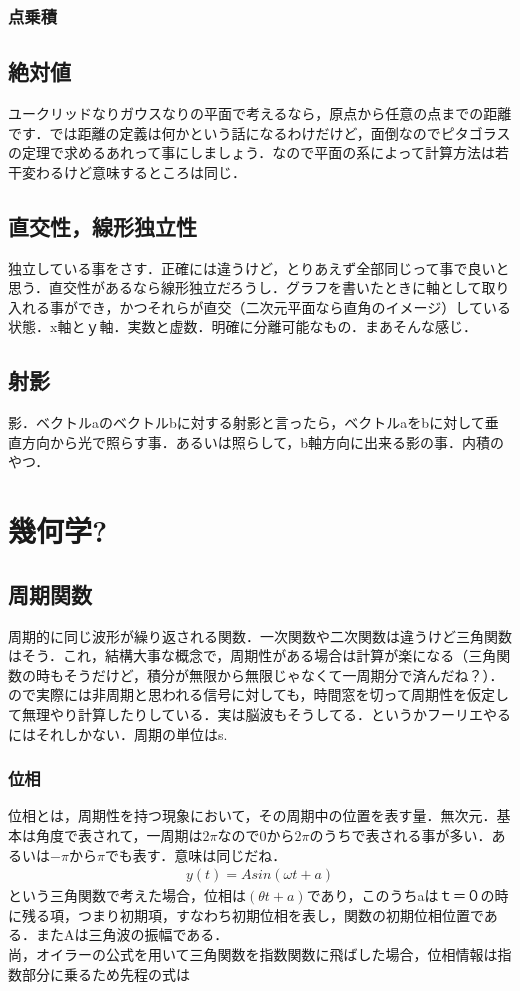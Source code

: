 \documentclass[11pt,a4paper]{jreport}
\begin{document}
\subsection{点乗積}
\section{絶対値}
ユークリッドなりガウスなりの平面で考えるなら，原点から任意の点までの距離です．では距離の定義は何かという話になるわけだけど，面倒なのでピタゴラスの定理で求めるあれって事にしましょう．なので平面の系によって計算方法は若干変わるけど意味するところは同じ．
\section{直交性，線形独立性}
独立している事をさす．正確には違うけど，とりあえず全部同じって事で良いと思う．直交性があるなら線形独立だろうし．グラフを書いたときに軸として取り入れる事ができ，かつそれらが直交（二次元平面なら直角のイメージ）している状態．x軸とｙ軸．実数と虚数．明確に分離可能なもの．まあそんな感じ．
\section{射影}
影．ベクトルaのベクトルbに対する射影と言ったら，ベクトルaをbに対して垂直方向から光で照らす事．あるいは照らして，b軸方向に出来る影の事．内積のやつ．


\chapter{幾何学?}
\section{周期関数}
周期的に同じ波形が繰り返される関数．一次関数や二次関数は違うけど三角関数はそう．これ，結構大事な概念で，周期性がある場合は計算が楽になる（三角関数の時もそうだけど，積分が無限から無限じゃなくて一周期分で済んだね？）．ので実際には非周期と思われる信号に対しても，時間窓を切って周期性を仮定して無理やり計算したりしている．実は脳波もそうしてる．というかフーリエやるにはそれしかない．周期の単位はs.

\subsection{位相}
位相とは，周期性を持つ現象において，その周期中の位置を表す量．無次元．基本は角度で表されて，一周期は$2\pi$なので0から$2\pi$のうちで表される事が多い．あるいは$-\pi$から$\pi$でも表す．意味は同じだね．
\begin{eqnarray}
y(t) = Asin(\omega t + a)
\end{eqnarray}
という三角関数で考えた場合，位相は$(\theta t + a)$であり，このうちaはｔ＝０の時に残る項，つまり初期項，すなわち初期位相を表し，関数の初期位相位置である．またAは三角波の振幅である．\\
尚，オイラーの公式を用いて三角関数を指数関数に飛ばした場合，位相情報は指数部分に乗るため先程の式は
\end{document}
